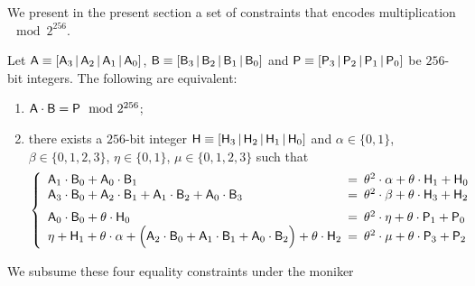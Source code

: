 We present in the present section a set of constraints \setMultiplication{} that encodes multiplication $\mod 2^{256}$.
\begin{lem}
Let 
$\textsf{A}\equiv[\textsf{A}_{3} \,|\, \textsf{A}_{2} \,|\, \textsf{A}_{1} \,|\, \textsf{A}_{0}]$,
$\textsf{B}\equiv[\textsf{B}_{3} \,|\, \textsf{B}_{2} \,|\, \textsf{B}_{1} \,|\, \textsf{B}_{0}]$
and
$\textsf{P} \equiv [\textsf{P}_{3} \,|\, \textsf{P}_{2} \,|\, \textsf{P}_{1} \,|\, \textsf{P}_{0}]$
be $256$-bit integers. The following are equivalent:
\begin{enumerate}
	\item $\textsf{A} \cdot \textsf{B} = \textsf{P} \mod 2^{256}$;
	\item there exists a $256$-bit integer $\textsf{H} \equiv [\textsf{H}_{3} \,|\, \textsf{H}_{2} \,|\, \textsf{H}_{1} \,|\, \textsf{H}_{0}]$
	and $\alpha \in \{ 0, 1 \}$,
	$\beta \in \{ 0, 1, 2, 3 \}$,
	$\eta \in \{ 0, 1 \}$,
	$\mu \in \{ 0, 1, 2, 3 \}$ such that
	\[
		\left\{ \begin{array}{lcl}
			\col{A}_{1} \cdot \col{B}_{0} + \col{A}_{0} \cdot \col{B}_{1}                                                                                                                   & \!\!\! = \!\!\! & \theta^2 \cdot \alpha + \theta \cdot \col{H}_{1} + \col{H}_{0}              \\
			\col{A}_{3} \cdot \col{B}_{0} + \col{A}_{2} \cdot \col{B}_{1} + \col{A}_{1} \cdot \col{B}_{2} + \col{A}_{0} \cdot \col{B}_{3}                                                   & \!\!\! = \!\!\! & \theta^2 \cdot \beta  + \theta \cdot \col{H}_{3} + \col{H}_{2} \vspace{2mm} \\
			\col{A}_{0} \cdot \col{B}_{0} + \theta \cdot \col{H}_{0}                                                                                                                        & \!\!\! = \!\!\! & \theta^2 \cdot \eta   + \theta \cdot \col{P}_{1} + \col{P}_{0}              \\
			\eta + \col{H}_{1} + \theta \cdot \alpha + \Big( \col{A}_{2} \cdot \col{B}_{0} + \col{A}_{1} \cdot \col{B}_{1} + \col{A}_{0} \cdot \col{B}_{2} \Big) + \theta \cdot \col{H}_{2} & \!\!\! = \!\!\! & \theta^2 \cdot \mu    + \theta \cdot \col{P}_{3} + \col{P}_{2}              \\
		\end{array} \right.
	\]
\end{enumerate}
\end{lem}
We subsume these four equality constraints under the moniker
